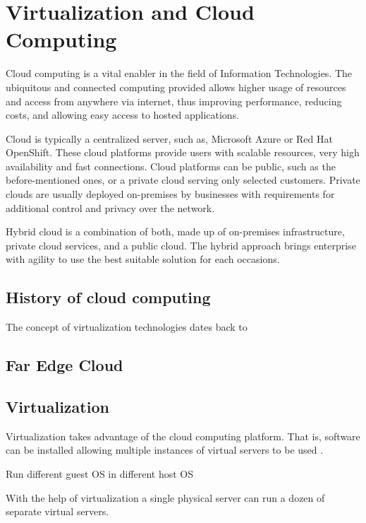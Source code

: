 \chapter{Virtualization and Cloud Computing}
\label{chapter:cloudcomputing}

Cloud computing is a vital enabler in the field of Information Technologies. The ubiquitous and connected computing provided allows higher usage of resources and access from anywhere via internet, thus improving performance, reducing costs, and allowing easy access to hosted applications.

Cloud is typically a centralized server, such as, Microsoft Azure or Red Hat OpenShift. These cloud platforms provide users with scalable resources, very high availability and fast connections. Cloud platforms can be public, such as the before-mentioned ones, or a private cloud serving only selected customers. Private clouds are usually deployed on-premises by businesses with requirements for additional control and privacy over the network. \cite{MicrosoftAzure}

Hybrid cloud is a combination of both, made up of on-premises infrastructure, private cloud services, and a public cloud. The hybrid approach brings enterprise with agility to use the best suitable solution for each occasions. \cite{NetApp}


\section{History of cloud computing}

The concept of virtualization technologies dates back to 

\section{Far Edge Cloud}

\section{Virtualization}

Virtualization takes advantage of the cloud computing platform. That is, software can be installed allowing multiple instances of virtual servers to be used \cite{Velte2009}.

Run different guest OS in different host OS

With the help of virtualization a single physical server can run a dozen of separate virtual servers.

